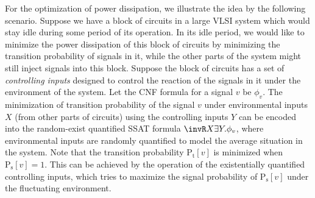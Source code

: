     For the optimization of power dissipation, we illustrate the idea by the following scenario. Suppose we have a block of circuits in a large VLSI system which would stay idle during some period of its operation. In its idle period, we would like to minimize the power dissipation of this block of circuits by minimizing the transition probability of signals in it, while the other parts of the system might still inject signals into this block. Suppose the block of circuits has a set of \textit{controlling inputs} designed to control the reaction of the signals in it under the environment of the system. Let the CNF formula for a signal $v$ be $\phi_v$. The minimization of transition probability of the signal $v$ under environmental inputs $X$ (from other parts of circuits) using the controlling inputs $Y$ can be encoded into the random-exist quantified SSAT formula $\invR X \exists Y. \phi_v$, where environmental inputs are randomly quantified to model the average situation in the system. Note that the transition probability $\mathrm{P_t}[v]$ is minimized when $\mathrm{P_s}[v]=1$. This can be achieved by the operation of the existentially quantified controlling inputs, which tries to maximize the signal probability of $\mathrm{P_s}[v]$ under the fluctuating environment.
\fi